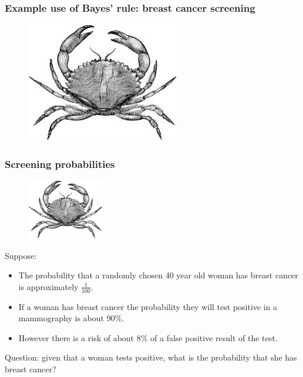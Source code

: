 \documentclass{beamer}
\begin{document}
	\begin{frame}
		\frametitle{Example use of Bayes' rule: breast cancer screening}
		
		\begin{figure}[ht]
			\includegraphics[width=0.6\textwidth]{./figures/crab2.jpeg}
		\end{figure}
	\end{frame}
	
	\begin{frame}
		\frametitle{Screening probabilities}
		
		
		\begin{figure}[ht]
			\includegraphics[width=0.3\textwidth]{./figures/crab2.jpeg}
		\end{figure}
		
		Suppose:
		\begin{itemize}
			\item The probability that a randomly chosen 40 year old woman has breast cancer is approximately $\frac{1}{100}$.
			\item If a woman has breast cancer the probability they will test positive in a mammography is about 90\%.
			\item However there is a risk of about 8\% of a false positive result of the test.
		\end{itemize}
		
	Question: given that a woman tests positive, what is the probability that she has breast cancer?
		
	\end{frame}
	
\end{document}
